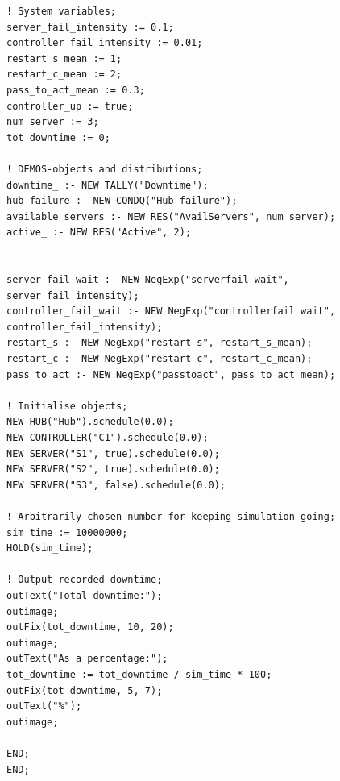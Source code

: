 \documentclass[11pt]{article}
\begin{document}
\begin{lstlisting}
! System variables;
server_fail_intensity := 0.1;
controller_fail_intensity := 0.01;
restart_s_mean := 1;
restart_c_mean := 2;
pass_to_act_mean := 0.3;
controller_up := true;
num_server := 3;
tot_downtime := 0;

! DEMOS-objects and distributions;        
downtime_ :- NEW TALLY("Downtime");
hub_failure :- NEW CONDQ("Hub failure");
available_servers :- NEW RES("AvailServers", num_server);
active_ :- NEW RES("Active", 2);


server_fail_wait :- NEW NegExp("serverfail wait", server_fail_intensity);
controller_fail_wait :- NEW NegExp("controllerfail wait", controller_fail_intensity);
restart_s :- NEW NegExp("restart s", restart_s_mean);
restart_c :- NEW NegExp("restart c", restart_c_mean);
pass_to_act :- NEW NegExp("passtoact", pass_to_act_mean);

! Initialise objects;
NEW HUB("Hub").schedule(0.0);
NEW CONTROLLER("C1").schedule(0.0);
NEW SERVER("S1", true).schedule(0.0);
NEW SERVER("S2", true).schedule(0.0);
NEW SERVER("S3", false).schedule(0.0);

! Arbitrarily chosen number for keeping simulation going;
sim_time := 10000000;
HOLD(sim_time);

! Output recorded downtime;
outText("Total downtime:");
outimage;
outFix(tot_downtime, 10, 20);
outimage;
outText("As a percentage:");
tot_downtime := tot_downtime / sim_time * 100;
outFix(tot_downtime, 5, 7);
outText("%");
outimage;

END;
END;


\end{lstlisting}
\end{document}
